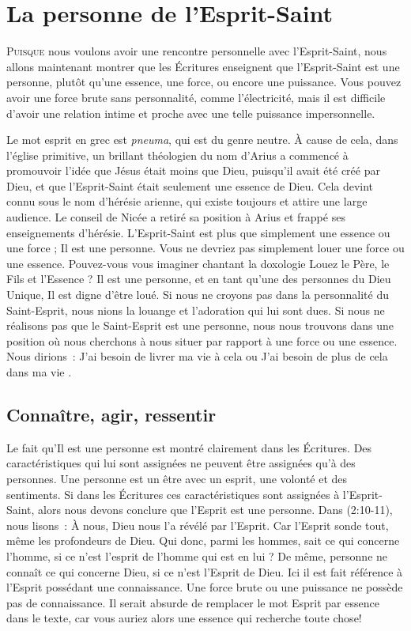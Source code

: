 \chapter{La personne de l'Esprit-Saint}

\lettrine[lines=3]{P}{uisque} nous voulons avoir une rencontre personnelle avec l'Esprit-Saint, nous allons maintenant montrer que les Écritures enseignent que l'Esprit-Saint est une personne, plutôt qu'une essence, une force, ou encore une puissance. Vous pouvez avoir une force brute sans personnalité, comme l'électricité, mais il est difficile d'avoir une relation intime et proche avec une telle puissance impersonnelle.

Le mot \og esprit \fg{} en grec est \emph{pneuma}, qui est du genre neutre. À cause de cela, dans l'église primitive, un brillant théologien du nom d'Arius a commencé à promouvoir l'idée que Jésus était moins que Dieu, puisqu'il avait été créé par Dieu, et que l'Esprit-Saint était seulement une \og essence \fg{} de Dieu. Cela devint connu sous le nom d'hérésie arienne, qui existe toujours et attire une large audience. Le conseil de Nicée a retiré sa position à Arius et frappé ses enseignements d'hérésie. L'Esprit-Saint est plus que simplement une essence ou une force ; Il est une personne. Vous ne devriez pas simplement louer une force ou une essence. Pouvez-vous vous imaginer chantant la doxologie \og Louez le Père, le Fils et l'Essence \fg{} ? Il est une personne, et en tant qu'une des personnes du Dieu Unique, Il est digne d'être loué. Si nous ne croyons pas dans la personnalité du Saint-Esprit, nous nions la louange et l'adoration qui lui sont dues. Si nous ne réalisons pas que le Saint-Esprit est une personne, nous nous trouvons dans une position où nous cherchons à nous situer par rapport à une force ou une essence. Nous dirions~: \og J'ai besoin de livrer ma vie à cela \fg{} ou \og J'ai besoin de plus de cela dans ma vie .\fg


\section{Connaître, agir, ressentir}

Le fait qu'Il est une personne est montré clairement dans les Écritures. Des caractéristiques qui lui sont assignées ne peuvent être assignées qu'à des personnes. Une personne est un être avec un esprit, une volonté et des sentiments. Si dans les Écritures ces caractéristiques sont assignées à l'Esprit-Saint, alors nous devons conclure que l'Esprit est une personne. Dans (2:10-11), nous lisons~: \og À nous, Dieu nous l'a révélé par l'Esprit. Car l'Esprit sonde tout, même les profondeurs de Dieu. Qui donc, parmi les hommes, sait ce qui concerne l'homme, si ce n'est l'esprit de l'homme qui est en lui ? De même, personne ne connaît ce qui concerne Dieu, si ce n'est l'Esprit de Dieu. \fg{} Ici il est fait référence à l'Esprit possédant une connaissance. Une force brute ou une puissance ne possède pas de connaissance. Il serait absurde de remplacer le mot \og Esprit \fg{} par \og essence \fg{} dans le texte, car vous auriez alors une \og essence \fg{} qui recherche toute chose!

